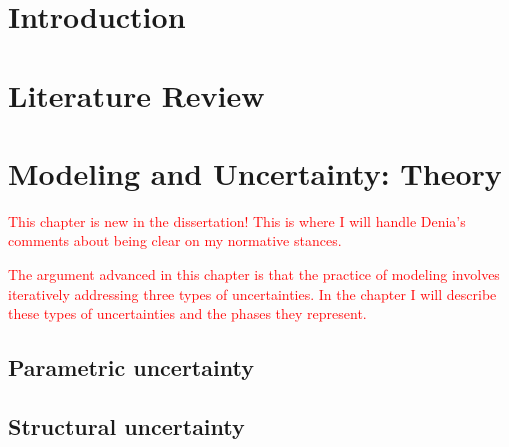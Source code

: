 \chapter{Introduction}
\chapter{Literature Review}
\label{chapter:lit-review}



% 

\chapter{Modeling and Uncertainty: Theory}

\textcolor{red}{This chapter is new in the dissertation! This is where I will handle 
Denia's comments about being clear on my normative stances.}

\textcolor{red}{The argument advanced in this chapter is that the practice of modeling
involves iteratively addressing three types of uncertainties. In the chapter I will
describe these types of uncertainties and the phases they represent.}

\section{Parametric uncertainty}

\section{Structural uncertainty}

